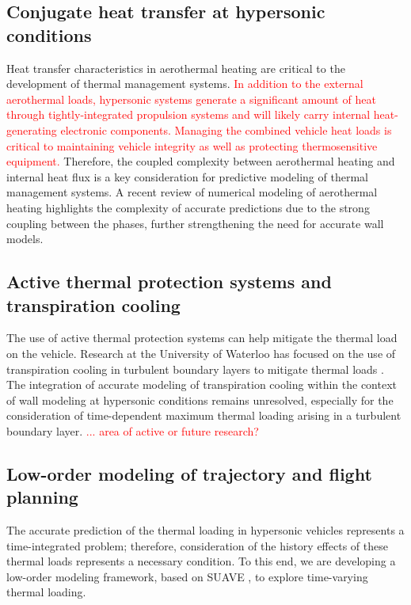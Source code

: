 \documentclass [11pt, fancyhdr, twoside] {article}
\newcommand{\rw}{\textcolor{red}}
\begin{document}
\subsection{Conjugate heat transfer at hypersonic conditions}
Heat transfer characteristics in aerothermal heating are critical to the development of thermal management systems. \rw{In addition to the external aerothermal loads, hypersonic systems generate a significant amount of heat through tightly-integrated propulsion systems and will likely carry internal heat-generating electronic components. Managing the combined vehicle heat loads is critical to maintaining vehicle integrity as well as protecting thermosensitive equipment.} Therefore, the coupled complexity between aerothermal heating and internal heat flux is a key consideration for predictive modeling of thermal management systems. A recent review of numerical modeling of aerothermal heating \citep{Lewis_Hickey_2023} highlights the complexity of accurate predictions due to the strong coupling between the phases, further strengthening the need for accurate wall models.



\subsection{Active thermal protection systems and transpiration cooling}
The use of active thermal protection systems can help mitigate the thermal load on the vehicle. Research at the University of Waterloo has focused on the use of transpiration cooling in turbulent boundary layers to mitigate thermal loads \citep{Christopher_Peter_Kloker_Hickey_2020,Bukva_Zhang_Christopher_Hickey_2021}. The integration of accurate modeling of transpiration cooling within the context of wall modeling at hypersonic conditions remains unresolved, especially for the consideration of time-dependent maximum thermal loading arising in a turbulent boundary layer. \rw{... area of active or future research?}




\subsection{Low-order modeling of trajectory and flight planning}

The accurate prediction of the thermal loading in hypersonic vehicles represents a time-integrated problem; therefore, consideration of the history effects of these thermal loads represents a necessary condition. To this end, we are developing a low-order modeling framework, based on SUAVE \citep{MacDonald_SUAVE_2017}, to explore time-varying thermal loading. 
\end{document}
